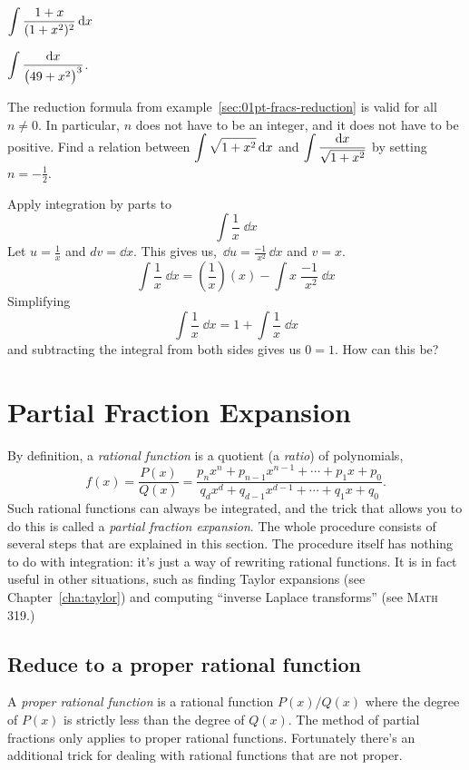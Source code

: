 \begin{multicols}{2}
\problem $\displaystyle \int \frac{1+ x}{(1+x^2)^2}\,\mathrm{d} x$ %

\problem $\displaystyle \int\frac{\mathrm{d} x}{\bigl(49+x^2\bigr)^3}$. %

\problem The reduction formula from example~\ref{sec:01pt-fracs-reduction} is %
valid for all $n\neq0$. In particular, $n$ does not have to be an integer, and
it does not have to be positive.  Find a relation between $\displaystyle\int
\sqrt{1+x^2}\,\mathrm{d} x$ and $\displaystyle\int\frac{\mathrm{d} x}{\sqrt{1+x^2}}$ by setting
$n=-\frac12$.

\problem Apply integration by parts to %
\[
\int \frac1x \;\dd x
\]
Let
$u=\frac1x$ and $dv=\dd x$.  This gives us,\ $\dd u=\frac{-1}{\;x^2}\,\dd x$
and $v=x$.
\[\int \frac1x \;\dd x = (\frac1x)(x) -\int x\;\frac{-1}{\;x^2}\;\dd x\]
Simplifying
\[\int \frac1x \;\dd x = 1 + \int \frac1x \;\dd x\]
and subtracting the integral from both sides gives us $0=1$.
How can this be?

\end{multicols}
\noproblemfont

\section{Partial Fraction Expansion} %
\label{sec:partial-fractions}
By definition, a \emph{rational function} is a quotient (a \textit{ratio}) of
polynomials,
\[
f(x) = \frac{P(x)}{Q(x)} = \frac{p_nx^n+p_{n-1}x^{n-1}+\cdots+p_1x+p_0}
{q_dx^d+q_{d-1}x^{d-1}+\cdots+q_1x+q_0}.
\]
Such rational functions can always be integrated, and the trick that allows you
to do this is called a \emph{partial fraction expansion}.  The whole procedure
consists of several steps that are explained in this section.  The procedure
itself has nothing to do with integration: it's just a way of rewriting rational
functions.  It is in fact useful in other situations, such as finding Taylor
expansions (see Chapter~\ref{cha:taylor}) and computing ``inverse Laplace
transforms'' (see \textsc{Math} 319.)


\subsection{Reduce to a proper rational function} %
\label{sec:reduce-prop-rati}
A \emph{proper rational function} is a rational function $P(x)/Q (x)$ where the
degree of $P(x)$ is strictly less than the degree of $Q(x)$.  The method of
partial fractions only applies to proper rational functions.  Fortunately
there's an additional trick for dealing with rational functions that are not
proper.


